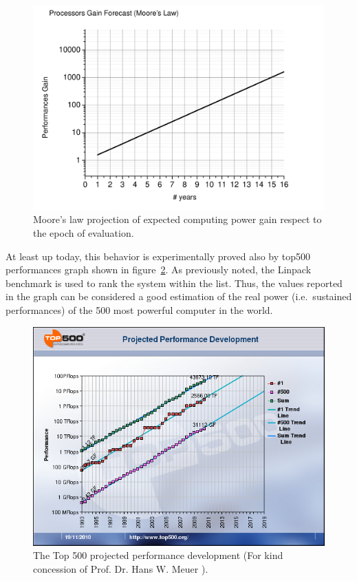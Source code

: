 \begin{figure}[h!]
\centering
\includegraphics[scale=0.50]{./Sec_ET_ScienceCase/moorelaw.png}
\caption{Moore's law projection of expected computing power gain respect to the epoch of evaluation.}
\label{fig:moorelaw}
\end{figure}


At least up today, this behavior is experimentally proved also by top500 performances graph shown in 
figure~\ref{fig:top500}. As previously noted, the Linpack benchmark is used to rank the system within the list. Thus, 
the values reported in the graph can be considered a good estimation of the real power (i.e.\ sustained performances) 
of the 500 most powerful computer in the world. 

\begin{figure}[h!]
\centering
\includegraphics[scale=0.50]{./Sec_ET_ScienceCase/top500graph.png}
\caption{The Top 500 projected performance development (For kind concession of Prof. Dr. Hans
W. Meuer ).}
\label{fig:top500}
\end{figure}

